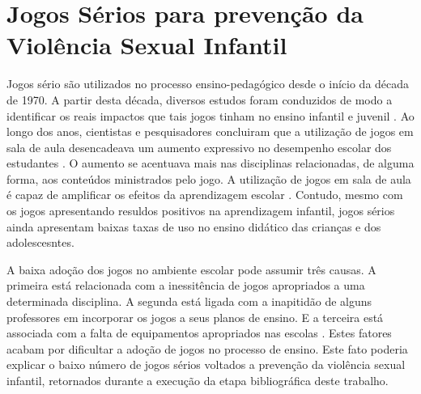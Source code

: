 



\chapter{Jogos Sérios para prevenção da Violência Sexual Infantil}\label{ssec:JS}

Jogos sério são utilizados no processo ensino-pedagógico desde o início da década de 1970. A partir desta década, diversos estudos foram conduzidos de modo a identificar os reais impactos que tais jogos tinham no ensino infantil e juvenil \cite{stieler2016paper}. Ao longo dos anos, cientistas e pesquisadores concluiram que a utilização de jogos em sala de aula desencadeava um aumento expressivo no desempenho escolar dos estudantes \cite{wentzel1998social}. O aumento se acentuava mais nas disciplinas relacionadas, de alguma forma, aos conteúdos ministrados pelo jogo. A utilização de jogos em sala de aula é capaz de amplificar os efeitos da aprendizagem escolar \cite{jones2020serious}. Contudo, mesmo com os jogos apresentando resuldos positivos na aprendizagem infantil, jogos sérios ainda apresentam baixas taxas de uso no ensino didático das crianças e dos adolescesntes. 

A baixa adoção dos jogos no ambiente escolar pode assumir três causas. A primeira está relacionada com a inessitência de jogos apropriados a uma determinada disciplina. A segunda está ligada com a inapitidão de alguns professores em incorporar os jogos a seus planos de ensino. E a terceira está associada com a falta de equipamentos apropriados nas escolas \cite{dip2016advancing}. Estes fatores acabam por dificultar a adoção de jogos no processo de ensino. Este fato poderia explicar o baixo número de jogos sérios voltados a prevenção da violência sexual infantil, retornados durante a execução da etapa bibliográfica deste trabalho. 

